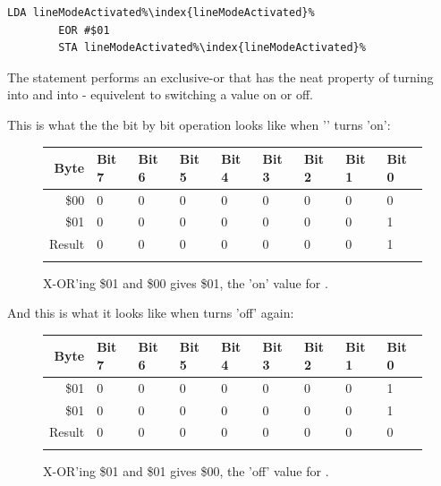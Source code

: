 \begin{lstlisting}[escapechar=\%]
        LDA lineModeActivated%\index{lineModeActivated}%
        EOR #$01
        STA lineModeActivated%\index{lineModeActivated}%
\end{lstlisting}

The  statement performs an exclusive-or that has the neat property of
turning  into  and  into  - equivelent
to switching a value on or off.

This is what the the bit by bit operation looks like when '' turns
 'on':

\begin{figure}[H]
  {
    \setlength{\tabcolsep}{3.0pt}
    \setlength\cmidrulewidth{\heavyrulewidth} %
    \begin{adjustbox}{width=7cm,center}

      \begin{tabular}{rllllllll}
        \toprule
        Byte & Bit 7 & Bit 6 & Bit 5 & Bit 4 & Bit 3 & Bit 2 & Bit 1 & Bit 0        \\
        \midrule
        \$00 & 0 & 0 & 0 & 0 & 0 & 0 & 0 & 0 \\
        \$01 & 0 & 0 & 0 & 0 & 0 & 0 & 0 & 1 \\
        \midrule
        Result & 0 & 0 & 0 & 0 & 0 & 0 & 0 & 1 \\
        \addlinespace
        \bottomrule
      \end{tabular}

    \end{adjustbox}

  }\caption*{X-OR'ing \$01 and \$00 gives \$01, the 'on' value for .}
\end{figure}

And this is what it looks like when  turns  'off' again:
\begin{figure}[H]
  {
    \setlength{\tabcolsep}{3.0pt}
    \setlength\cmidrulewidth{\heavyrulewidth} %
    \begin{adjustbox}{width=7cm,center}

      \begin{tabular}{rllllllll}
        \toprule
        Byte & Bit 7 & Bit 6 & Bit 5 & Bit 4 & Bit 3 & Bit 2 & Bit 1 & Bit 0        \\
        \midrule
        \$01 & 0 & 0 & 0 & 0 & 0 & 0 & 0 & 1 \\
        \$01 & 0 & 0 & 0 & 0 & 0 & 0 & 0 & 1 \\
        \midrule
        Result & 0 & 0 & 0 & 0 & 0 & 0 & 0 & 0 \\
        \addlinespace
        \bottomrule
      \end{tabular}

    \end{adjustbox}

  }\caption*{X-OR'ing \$01 and \$01 gives \$00, the 'off' value for .}
\end{figure}
\clearpage

